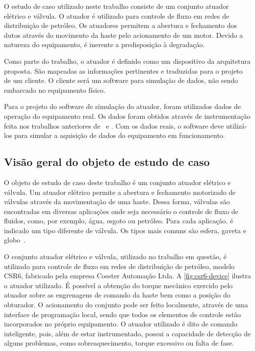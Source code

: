 O estudo de caso utilizado neste trabalho consiste de um conjunto atuador elétrico e válvula. O
atuador é utilizado para controle de fluxo em redes de distribuição de petróleo. Os atuadores
permitem a abertura e fechamento dos dutos através do movimento da haste pelo acionamento de um
motor. Devido a natureza do equipamento, é inerente a predisposição à degradação.

Como parte do trabalho, o atuador é definido como um dispositivo da arquitetura proposta. São
mapeadas as informações pertinentes e traduzidas para o projeto de um cliente. O cliente será um
software para simulação de dados, não sendo embarcado no equipamento físico.

Para o projeto do software de simulação do atuador, foram utilizados dados de operação do
equipamento real. Os dados foram obtidos através de instrumentação feita nos trabalhos anteriores
de~\cite{boesch2011deteccao} e \cite{faccin2011manutencao}. Com os dados reais, o software deve
utilizá-los para simular a aquisição de dados do equipamento em funcionamento.


\subsection{Visão geral do objeto de estudo de caso}

O objeto de estudo de caso deste trabalho é um conjunto atuador elétrico e válvula. Um atuador
elétrico permite a abertura e fechamento motorizado de válvulas através da movimentação de uma
haste. Dessa forma, válvulas são encontradas em diversas aplicações onde seja necessário o controle
de fluxo de fluidos, como, por exemplo, água, esgoto ou petróleo. Para cada aplicação, é indicado um
tipo diferente de válvula. Os tipos mais comuns são esfera, gaveta e
globo~\cite{campos2006controles}.

O conjunto atuador elétrico e válvula, utilizado no trabalho em questão, é utilizado para controle
de fluxo em redes de distribuição de petróleo, modelo CSR6, fabricado pela empresa Coester Automação
Ltda. A \cref{fig:csr6-device} ilustra o atuador utilizado. É possível a obtenção do torque mecânico
exercido pelo atuador sobre as engrenagens de comando da haste bem como a posição do obturador. O
acionamento do conjunto pode ser feito localmente, através de uma interface de programação local,
sendo que todos os elementos de controle estão incorporados no próprio equipamento. O atuador
utilizado é dito de comando inteligente, pois, além de estar instrumentado, possui a capacidade de
detecção de alguns problemas, como sobreaquecimento, torque excessivo ou falta de fase.

